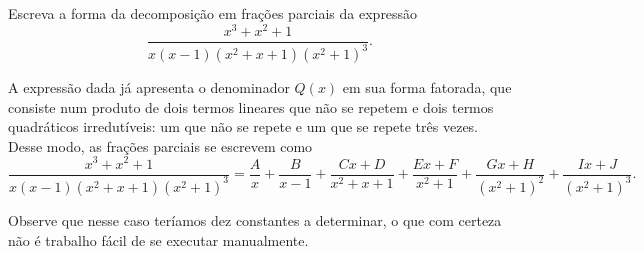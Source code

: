 \begin{exem}
    Escreva a forma da decomposição em frações parciais da expressão $$\dfrac{x^3 + x^2 + 1}{x(x-1)(x^2 + x + 1)(x^2 + 1)^3}.$$

   A expressão dada já apresenta o denominador $Q(x)$ em sua forma fatorada, que consiste num produto de dois termos lineares que não se repetem e dois termos quadráticos irredutíveis: um que não se repete e um que se repete três vezes. Desse modo, as frações parciais se escrevem como 
    \begin{equation*}
    \dfrac{x^3 + x^2 + 1}{x(x-1)(x^2 + x + 1)(x^2 + 1)^3} = \dfrac{A}{x} + \dfrac{B}{x-1} + \dfrac{Cx + D}{x^2+x + 1} + \dfrac{Ex + F}{x^2+1} + \dfrac{Gx + H}{(x^2+1)^2} + \dfrac{Ix + J}{(x^2+1)^3}.
    \end{equation*}

    Observe que nesse caso teríamos dez constantes a determinar, o que com certeza não é trabalho fácil de se executar manualmente.

    \end{exem}

